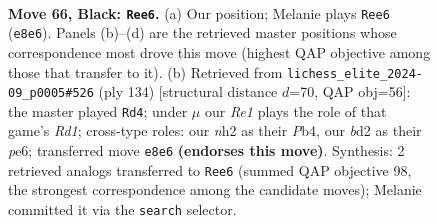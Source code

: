 \documentclass[11pt]{article}
\begin{document}
\clearpage

\begin{figure}[p]\centering
\begin{subfigure}{0.46\textwidth}\centering
\resizebox{\linewidth}{!}{%
\newchessgame
\chessboard[
  setfen={4r1k1/6p1/p2b3r/Pppb1p1p/2p2P1P/4P1P1/1P1BK2N/1R4R1 b - - 5 66},
  showmover=false,
  pgfstyle=straightmove, color=movearrow, markmove={e8-e6}
]}
\caption{}
\end{subfigure}\hfill
\begin{subfigure}{0.46\textwidth}\centering
\resizebox{\linewidth}{!}{%
\newchessgame
\chessboard[
  setfen={2r3r1/2kb1p2/4p1p1/1p1pP2p/pP3P2/P1P3P1/2R1BK1P/3R4 w - - 75 68},
  showmover=false,
  pgfstyle=straightmove, color=movearrow, markmove={d1-d4}
]}
\caption{}
\end{subfigure}
\\[4pt]

\caption{\textbf{Move 66, Black: \texttt{Ree6}.} (a) Our position; Melanie plays \texttt{Ree6} (\texttt{e8e6}). Panels (b)--(d) are the retrieved master positions whose correspondence most drove this move (highest QAP objective among those that transfer to it). (b) Retrieved from \texttt{lichess\_elite\_2024-09\_p0005\#526} (ply 134) [structural distance $d$=70, QAP obj=56]: the master played \texttt{Rd4}; under $\mu$ our \emph{Re1} plays the role of that game's \emph{Rd1}; cross-type roles: our \emph{n}h2 as their \emph{P}b4, our \emph{b}d2 as their \emph{p}e6; transferred move \texttt{e8e6} \textbf{(endorses this move)}. Synthesis: 2 retrieved analogs transferred to \texttt{Ree6} (summed QAP objective 98, the strongest correspondence among the candidate moves); Melanie committed it via the \texttt{search} selector.}
\label{fig:thought-m131}
\end{figure}

\clearpage
\end{document}
